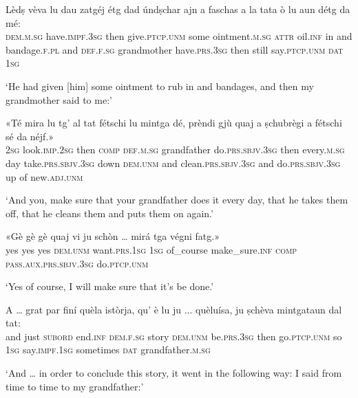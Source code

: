 \begin{linenumbers}
\gll  Lèdṣ vèva lu dau zatgéj étg dad úndṣchar ajn a faschas a la tata ò lu aun détg da mé:  \\
 \textsc{dem.m.sg} have.\textsc{impf.3sg} then  give.\textsc{ptcp.unm} some ointment.\textsc{m.sg} \textsc{attr} oil.\textsc{inf} in and bandage.\textsc{f.pl} and \textsc{def.f.sg} grandmother have.\textsc{prs.3sg} then still say.\textsc{ptcp.unm} \textsc{dat} \textsc{1sg}  \\
\end{linenumbers}
\medskip
\glt `He had given [him] some ointment to rub in and bandages, and then my grandmother said to me:'
\medskip

\begin{linenumbers}
\gll  «Té mira lu tg’ al tat fétschi lu mintga dé, prèndi gjù quaj a ṣchubrègi a fétschi sé da néjf.»  \\
 \textsc{2sg} look.\textsc{imp.2sg} then \textsc{comp} \textsc{def.m.sg} grandfather do.\textsc{prs.sbjv.3sg} then every.\textsc{m.sg} day take.\textsc{prs.sbjv.3sg} down \textsc{dem.unm} and clean.\textsc{prs.sbjv.3sg} and do.\textsc{prs.sbjv.3sg} up of new.\textsc{adj.unm} \\
\end{linenumbers}
\medskip
\glt `And you, make sure that your grandfather does it every day, that he takes them off, that he cleans them and puts them on again.'
\medskip

\begin{linenumbers}
\gll  «Gè gè gè quaj vi ju schòn … mirá tga végni fatg.»  \\
yes yes yes  \textsc{dem.unm} want.\textsc{prs.1sg} \textsc{1sg} of\_course {}  make\_sure.\textsc{inf} \textsc{comp} \textsc{pass.aux.prs.sbjv.3sg} do.\textsc{ptcp.unm}   \\
\end{linenumbers}
\medskip
\glt `Yes of course, I will make sure that it's be done.'
\medskip

\begin{linenumbers}
\gll  A … grat par finí quèla istòrja, qu’ è lu ju ... quèluísa, ju ṣchèva mintgataun dal tat:  \\
and {} just  \textsc{subord} end.\textsc{inf} \textsc{dem.f.sg} story \textsc{dem.unm} be.\textsc{prs.3sg} then go.\textsc{ptcp.unm} {} so \textsc{1sg} say.\textsc{impf.1sg}  sometimes \textsc{dat} grandfather.\textsc{m.sg} \\
\end{linenumbers}
\medskip
\glt `And … in order to conclude this story, it went in the following way: I said from time to time to my grandfather:'
\medskip

